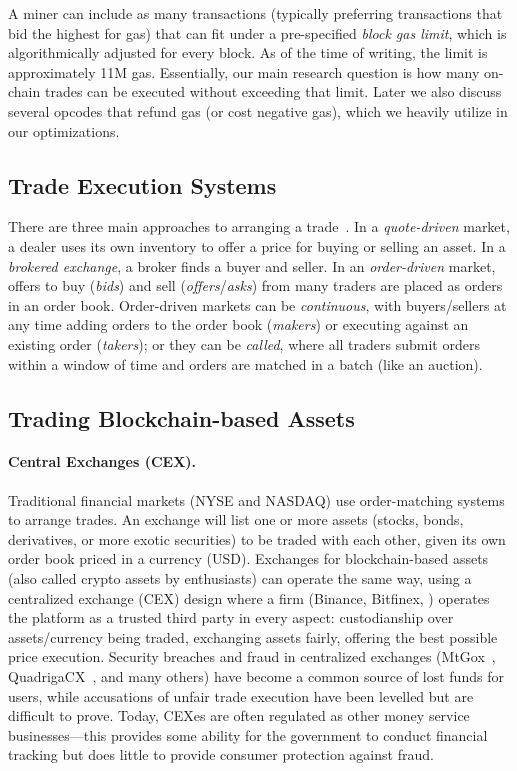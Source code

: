 A miner can include as many transactions (typically preferring transactions that bid the highest for gas) that can fit under a pre-specified \textit{block gas limit}, which is algorithmically adjusted for every block. As of the time of writing, the limit is approximately 11M gas. Essentially, our main research question is how many on-chain trades can be executed without exceeding that limit. Later we also discuss several opcodes that refund gas (or cost negative gas), which we heavily utilize in our optimizations.

\subsection{Trade Execution Systems}

 There are three main approaches to arranging a trade~\cite{Har03}. In a \emph{quote-driven} market, a dealer uses its own inventory to offer a price for buying or selling an asset. In a \emph{brokered exchange}, a broker finds a buyer and seller. In an \emph{order-driven} market, offers to buy (\emph{bids}) and sell (\emph{offers}/\emph{asks}) from many traders are placed as orders in an order book. Order-driven markets can be \emph{continuous}, with buyers/sellers at any time adding orders to the order book (\emph{makers}) or executing against an existing order (\emph{takers}); or they can be \emph{called}, where all traders submit orders within a window of time and orders are matched in a batch (like an auction). 

\subsection{Trading Blockchain-based Assets}

%

\paragraph{Central Exchanges (CEX).} Traditional financial markets (\eg NYSE and NASDAQ) use order-matching systems to arrange trades. An exchange will list one or more assets (stocks, bonds, derivatives, or more exotic securities) to be traded with each other, given its own order book priced in a currency (\eg USD). Exchanges for blockchain-based assets (also called crypto assets by enthusiasts) can operate the same way, using a centralized exchange (CEX) design where a firm (\eg Binance, Bitfinex, \etc) operates the platform as a trusted third party in every aspect: custodianship over assets/currency being traded, exchanging assets fairly, offering the best possible price execution. Security breaches and fraud in centralized exchanges  (\eg MtGox~\cite{TheHisto45:online}, QuadrigaCX~\cite{SEBIOrde83:online}, and many others) have become a common source of lost funds for users, while accusations of unfair trade execution have been levelled but are difficult to prove. Today, CEXes are often regulated as other money service businesses---this provides some ability for the government to conduct financial tracking but does little to provide consumer protection against fraud. 

